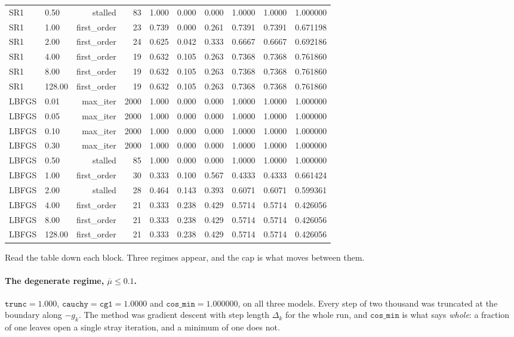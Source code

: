 \documentclass[11pt,a4paper]{article}
\theoremstyle{remark}
\begin{document}
\begin{table}[H]
\begin{tabular}{llrrrrrrrr}
    SR1 & 0.50 & stalled & 83 & 1.000 & 0.000 & 0.000 & 1.0000 & 1.0000 & 1.000000 \\
    SR1 & 1.00 & first\_order & 23 & 0.739 & 0.000 & 0.261 & 0.7391 & 0.7391 & 0.671198 \\
    SR1 & 2.00 & first\_order & 24 & 0.625 & 0.042 & 0.333 & 0.6667 & 0.6667 & 0.692186 \\
    SR1 & 4.00 & first\_order & 19 & 0.632 & 0.105 & 0.263 & 0.7368 & 0.7368 & 0.761860 \\
    SR1 & 8.00 & first\_order & 19 & 0.632 & 0.105 & 0.263 & 0.7368 & 0.7368 & 0.761860 \\
    SR1 & 128.00 & first\_order & 19 & 0.632 & 0.105 & 0.263 & 0.7368 & 0.7368 & 0.761860 \\
    \midrule
    LBFGS & 0.01 & max\_iter & 2000 & 1.000 & 0.000 & 0.000 & 1.0000 & 1.0000 & 1.000000 \\
    LBFGS & 0.05 & max\_iter & 2000 & 1.000 & 0.000 & 0.000 & 1.0000 & 1.0000 & 1.000000 \\
    LBFGS & 0.10 & max\_iter & 2000 & 1.000 & 0.000 & 0.000 & 1.0000 & 1.0000 & 1.000000 \\
    LBFGS & 0.30 & max\_iter & 2000 & 1.000 & 0.000 & 0.000 & 1.0000 & 1.0000 & 1.000000 \\
    LBFGS & 0.50 & stalled & 85 & 1.000 & 0.000 & 0.000 & 1.0000 & 1.0000 & 1.000000 \\
    LBFGS & 1.00 & first\_order & 30 & 0.333 & 0.100 & 0.567 & 0.4333 & 0.4333 & 0.661424 \\
    LBFGS & 2.00 & stalled & 28 & 0.464 & 0.143 & 0.393 & 0.6071 & 0.6071 & 0.599361 \\
    LBFGS & 4.00 & first\_order & 21 & 0.333 & 0.238 & 0.429 & 0.5714 & 0.5714 & 0.426056 \\
    LBFGS & 8.00 & first\_order & 21 & 0.333 & 0.238 & 0.429 & 0.5714 & 0.5714 & 0.426056 \\
    LBFGS & 128.00 & first\_order & 21 & 0.333 & 0.238 & 0.429 & 0.5714 & 0.5714 & 0.426056 \\
    \bottomrule
  \end{tabular}
\end{table}

Read the table down each block. Three regimes appear, and the cap is what moves
between them.

\paragraph{The degenerate regime, $\overline{\mu} \leq 0.1$.}
$\texttt{trunc} = 1.000$, $\texttt{cauchy} = \texttt{cg1} = 1.0000$ and
$\texttt{cos\_min} = 1.000000$, on all three models. Every step of two thousand
was truncated at the boundary along $-g_k$. The method was gradient descent with
step length $\Delta_k$ for the whole run, and $\texttt{cos\_min}$ is what says
\emph{whole}: a fraction of one leaves open a single stray iteration, and a
minimum of one does not.
\end{document}
